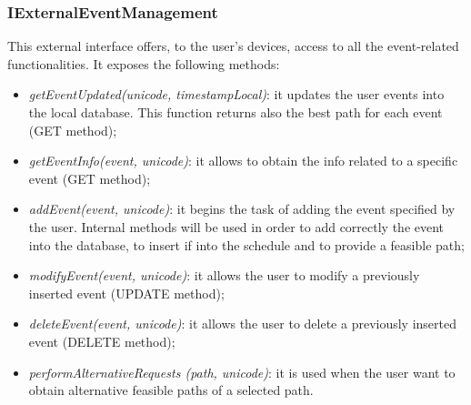 \subsubsection{IExternalEventManagement}
This external interface offers, to the user's devices, access to all the event-related functionalities. It exposes the following methods:
\begin{itemize}
\item \textit{getEventUpdated(unicode, timestampLocal)}: it updates the user events into the local database. This function returns also the best path for each event (GET method);
\item \textit{getEventInfo(event, unicode)}: it allows to obtain the info related to a specific event (GET method);
\item \textit{addEvent(event, unicode)}: it begins the task of adding the event specified by the user. Internal methods will be used in order to add correctly the event into the database, to insert if into the schedule and to provide a feasible path;
\item \textit{modifyEvent(event, unicode)}: it allows the user to modify a previously inserted event (UPDATE method);
\item \textit{deleteEvent(event, unicode)}: it allows the user to delete a previously inserted event (DELETE method);
\item \textit{performAlternativeRequests (path, unicode)}: it is used when the user want to obtain alternative feasible paths of a selected path.
\end{itemize}

